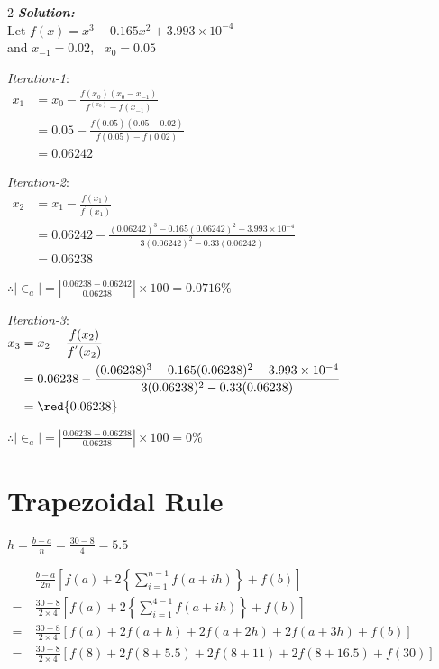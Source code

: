 \begin{multicols}{2}
\noindent
\raggedcolumns
\textbf{\textit{Solution:}}\\[0.5em]
Let $f(x) = x^3 - 0.165x^2 + 3.993 \times 10^{-4}$\\[0.5em]
and $x_{-1} = 0.02$, \ $x_0 = 0.05$

\textit{Iteration-1}:\\[0.5em]
$\begin{aligned}
   x_{1} &= x_0 - \frac{f(x_0)(x_0 - x_{-1})}{f^(x_0)-f(x_{-1})} \\
   &= 0.05 - \frac{f(0.05)(0.05 - 0.02)}{f(0.05) - f(0.02)} \\
   &= 0.06242
\end{aligned}$

\columnbreak
\textit{Iteration-2}:\\[0.5em]
$\begin{aligned}
   x_{2} &= x_1 - \frac{f(x_1)}{f^{'}(x_1)} \\
   &= 0.06242 - \frac{(0.06242)^3 - 0.165(0.06242)^2 + 3.993 \times 10^{-4}}{3(0.06242)^2 - 0.33(0.06242)} \\
   &= 0.06238
\end{aligned}$

$\therefore |\in_a| = \left|\frac{0.06238 - 0.06242}{0.06238}\right| \times 100 = 0.0716\%$

\textit{Iteration-3}:\\[0.5em]
$\begin{aligned}
   x_{3} &= x_2 - \frac{f(x_2)}{f^{'}(x_2)} \\
   &= 0.06238 - \frac{(0.06238)^3 - 0.165(0.06238)^2 + 3.993 \times 10^{-4}}{3(0.06238)^2 - 0.33(0.06238)} \\
   &= \red{0.06238}
\end{aligned}$

$\therefore |\in_a| = \left|\frac{0.06238 - 0.06238}{0.06238}\right| \times 100 = 0\%$
\end{multicols}


\pagebreak

\section*{Trapezoidal Rule}
$h = \frac{b-a}{n} = \frac{30-8}{4} = 5.5$


$\begin{aligned}
   &\frac{b-a}{2n}\left[f(a) + 2\left\{\sum_{i=1}^{n-1}f(a+ih)\right\} + f(b)\right]
   \\
   = \ &\frac{30-8}{2\times 4}\left[f(a) + 2\left\{\sum_{i=1}^{4-1}f(a+ih)\right\} + f(b)\right]
   \\
   = \ &\frac{30-8}{2\times 4}\left[f(a) + 2f(a+h) + 2f(a+2h) + 2f(a+3h) + f(b)\right]
   \\
   = \ &\frac{30-8}{2 \times 4}\left[f(8) + 2f(8+5.5) + 2f(8+11) + 2f(8+16.5) + f(30)\right]
\end{aligned}$